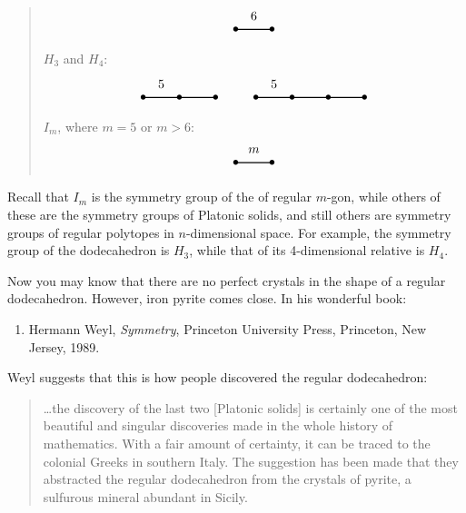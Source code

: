 \documentclass{article}
\def\tightlist{}
\begin{document}
\begin{quote}
\[\begin{tikzpicture}
    \draw[thick] (0,0) node{$\bullet$} to node[label=above:{6}]{} (1,0) node{$\bullet$};
  \end{tikzpicture}
\] \(H_3\) and \(H_4\): \[
  \begin{tikzpicture}
    \draw[thick] (0,0) node{$\bullet$} to node[label=above:{5}]{} (1,0) node{$\bullet$} to (2,0) node{$\bullet$};
  \end{tikzpicture}
  \qquad
  \begin{tikzpicture}
  \draw[thick] (0,0) node{$\bullet$} to node[label=above:{5}]{} (1,0) node{$\bullet$} to (2,0) node{$\bullet$} to (3,0) node {$\bullet$};
\end{tikzpicture}
\] \(I_m\), where \(m = 5\) or \(m > 6\): \[
  \begin{tikzpicture}
    \draw[thick] (0,0) node{$\bullet$} to node[label=above:{$m$}]{} (1,0) node{$\bullet$};
  \end{tikzpicture}
\]
\end{quote}

Recall that \(I_m\) is the symmetry group of the of regular \(m\)-gon,
while others of these are the symmetry groups of Platonic solids, and
still others are symmetry groups of regular polytopes in
\(n\)-dimensional space. For example, the symmetry group of the
dodecahedron is \(H_3\), while that of its 4-dimensional relative is
\(H_4\).

Now you may know that there are no perfect crystals in the shape of a
regular dodecahedron. However, iron pyrite comes close. In his wonderful
book:

\begin{enumerate}
\def\labelenumi{\arabic{enumi})}
\tightlist
\item
  Hermann Weyl, \emph{Symmetry}, Princeton University Press, Princeton,
  New Jersey, 1989.
\end{enumerate}

Weyl suggests that this is how people discovered the regular
dodecahedron:

\begin{quote}
\ldots the discovery of the last two {[}Platonic solids{]} is certainly
one of the most beautiful and singular discoveries made in the whole
history of mathematics. With a fair amount of certainty, it can be
traced to the colonial Greeks in southern Italy. The suggestion has been
made that they abstracted the regular dodecahedron from the crystals of
pyrite, a sulfurous mineral abundant in Sicily.
\end{quote}
\end{document}

